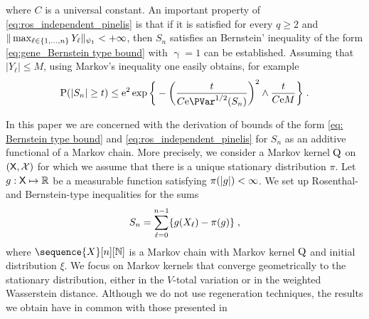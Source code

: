 where $C$ is a universal constant. An important property of \eqref{eq:ros_independent_pinelis} is that if it is satisfied for every $q \geq 2$ and $ \| \max_{\ell \in \{1,\dots,n\}} Y_\ell \|_{\psi_{1}}  < +\infty$, then $S_n$ satisfies an Bernstein' inequality of the form \eqref{eq:gene_Bernstein type bound} with $\upgamma =1$ can be established.
Assuming that $|Y_\ell|  \le M$, using Markov's inequality one easily obtains, for example
\begin{equation}
    \PP(|S_n| \geq t) \le \rme^2 \exp \bigg\{ -  \bigg(\frac{t}{C \rme \PVar^{1/2}(S_n)}\bigg)^2 \wedge \frac{t}{C \rme M} \bigg\} \eqsp.
\end{equation}
\par 
In this paper we are concerned with the derivation of bounds of the form \eqref{eq: Bernstein type bound} and \eqref{eq:ros_independent_pinelis} for $S_n$ as an additive functional of a Markov chain. More precisely, we consider a Markov kernel ${\rm Q}$ on $(\mathsf{X},\mathcal{X})$ for which we assume that there is a unique stationary distribution $\pi$. Let $g:\mathsf{X} \mapsto \mathbb{R}$ be a measurable function satisfying $\pi(\vert g \vert) < \infty$. We set up Rosenthal- and Bernstein-type inequalities for the sums
\begin{equation}
\label{eq:def_S_n_g}
S_n = \sum_{\ell=0}^{n-1}  \{g(X_\ell) - \pi(g)\} \;,
\end{equation}
where $\sequence{X}[n][\nset]$ is a Markov chain with Markov kernel ${\rm Q}$ and initial distribution $\xi$. We focus on Markov kernels that converge geometrically to the stationary distribution, either in the $V$-total variation or in the weighted Wasserstein distance. Although we do not use regeneration techniques, the results we obtain have in common with those presented in \cite{clemenccon2001moment,Adamczak2008,adamczak2015exponential,bertail2018new,lemanczyk2020general}
